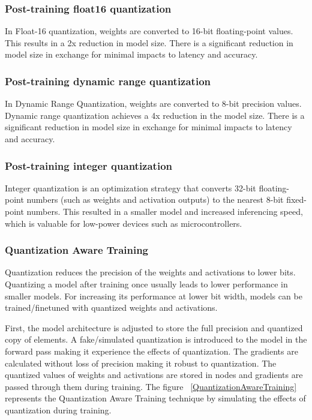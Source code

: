 \subsubsection{Post-training float16 quantization}
In Float-16 quantization, weights are converted to 16-bit floating-point values. This results in a 2x reduction in model size. There is a significant reduction in model size in exchange for minimal impacts to latency and accuracy. \cite{opencvtensorflow:2023} \cite{tfl_Opt:2024}

\subsubsection{Post-training dynamic range quantization}
In Dynamic Range Quantization, weights are converted to 8-bit precision values. Dynamic range quantization achieves a 4x reduction in the model size. There is a significant reduction in model size in exchange for minimal impacts to latency and accuracy. \cite{opencvtensorflow:2023} \cite{tfl_Opt:2024}

\subsubsection{Post-training integer quantization}
Integer quantization is an optimization strategy that converts 32-bit floating-point numbers (such as weights and activation outputs) to the nearest 8-bit fixed-point numbers. This resulted in a smaller model and increased inferencing speed, which is valuable for low-power devices such as microcontrollers. \cite{opencvtensorflow:2023} \cite{tfl_Opt:2024}

\subsubsection{Quantization Aware Training}
Quantization reduces the precision of the weights and activations to lower bits. Quantizing a model after training once usually leads to lower performance in smaller models. For increasing its performance at lower bit width, models can be trained/finetuned with quantized weights and activations.

First, the model architecture is adjusted to store the full precision and quantized copy of elements. A fake/simulated quantization is introduced to the model in the forward pass making it experience the effects of quantization.
The gradients are calculated without loss of precision making it robust to quantization. The quantized values of weights and activations are stored in nodes and gradients are passed through them during training. The figure ~\ref{QuantizationAwareTraining} represents the Quantization Aware Training technique by simulating the effects of quantization during training.

